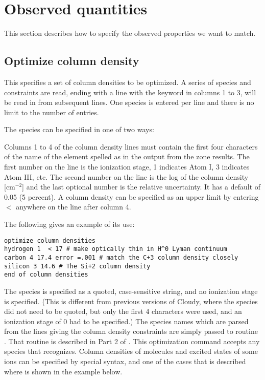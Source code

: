 \section{Observed quantities}
\label{sec:observed_quantities}

This section describes how to specify the observed properties we want
to match.

\subsection{Optimize column density}

This specifies a set of column densities to be optimized.
A series of species and constraints are read,
ending with a line with the keyword  in columns 1 to 3,
will be read
in from subsequent lines.
One species is entered per line and there is no limit to
the number of entries.

The species can be specified in one of two ways:

Columns 1 to 4 of the column density lines must
contain the first four characters of the name of the element spelled as
in the output from the zone results.
The first number on the line is the
ionization stage, 1 indicates Atom I, 3 indicates Atom III, etc.
The second
number on the line is the log of the column density [cm$^{-2}$]
and the last
optional number is the relative uncertainty.
It has a default of 0.05 (5
percent).
A column density can be specified as an upper limit by entering
$<$ anywhere on the line after column 4.

The following gives an example of its use:
\begin{verbatim}
optimize column densities
hydrogen 1  < 17 # make optically thin in H^0 Lyman continuum
carbon 4 17.4 error =.001 # match the C+3 column density closely
silicon 3 14.6 # The Si+2 column density
end of column densities
\end{verbatim}

The species is specified as a quoted, case-sensitive string, and no ionization
stage is specified.  (This is different from previous
versions of Cloudy, where the species did not need to be quoted, but
only the first 4 characters were used, and an ionization stage
of 0 had to be specified.)
The species names which are parsed from the lines giving the column density
constraints
are simply
passed to routine .
That routine is described in Part 2 of \Hazy.
This optimization command accepts any species that
 recognizes.
Column densities of molecules and excited states of some ions
can be specified by special syntax, and one of the cases
that is described where  is shown in the example below.

